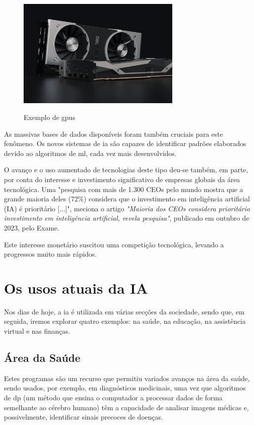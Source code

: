 \documentclass{report}
\begin{document}
\begin{figure}[H]
\caption{Exemplo de \ac{gpus}}
\centering
\includegraphics[width=8cm]{imagens/gpu.jpg}
\label{gpu}
\end{figure}

\nocite{gpu}

	As massivas bases de dados disponíveis foram também cruciais para este fenômeno. Os novos sistemas de \ac{ia} são capazes de identificar padrões elaborados devido ao algoritmos de \ac{ml}, cada vez mais desenvolvidos. \cite{machine_learning}

	O avanço e o uso aumentado de tecnologias deste tipo deu-se também, em parte, por conta do interesse e investimento significativo de empresas globais da área tecnológica. Uma "pesquisa com mais de 1.300 CEOs pelo mundo mostra que a grande maioria deles (72\%) considera que o investimento em inteligência artificial (IA) é prioritário [...]", meciona o artigo \textit{"Maioria dos CEOs considera prioritário investimento em inteligência artificial, revela pesquisa"}, publicado em outubro de 2023, pelo Exame. \cite{investimento}
	
	Este interesse monetário suscitou uma competição tecnológica, levando a progressos muito mais rápidos.

\section{Os usos atuais da IA}
\label{sec.os_usos_atuais_da_ia}

	Nos dias de hoje, a \ac{ia} é utilizada em várias secções da sociedade, sendo que, em seguida, iremos explorar quatro exemplos: na saúde, na educação, na assistência virtual e nas finanças.
	
\subsection{Área da Saúde}
\label{subsec.saude}

	Estes programas são um recurso que permitiu variados avanços na área da saúde, sendo usados, por exemplo, em diagnósticos medicinais, uma vez que algoritmos de \ac{dp} (um método que ensina o computador a processar dados de forma semelhante ao cérebro humano) têm a capacidade de analisar imagens médicas e, possivelmente, identificar sinais precoces de doenças. \cite{saude1} \cite{saude2} \cite{saude3}
\end{document}
